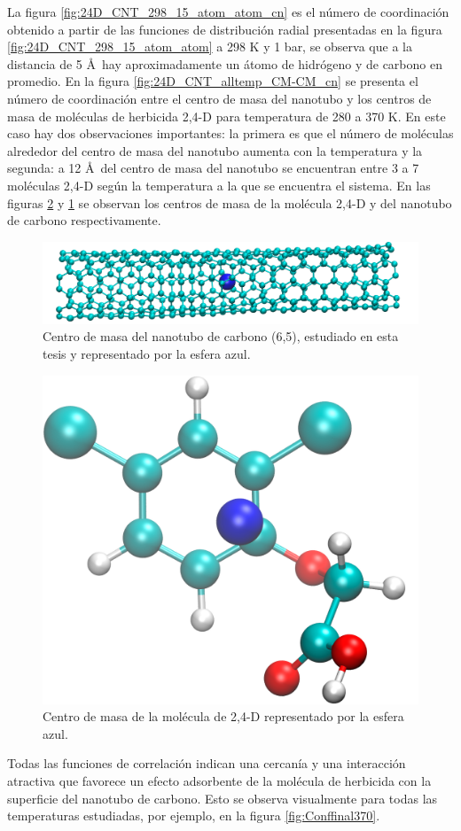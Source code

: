 La figura \ref{fig:24D_CNT_298_15_atom_atom_cn} es el número de coordinación obtenido a partir de las funciones de distribución radial presentadas en la figura \ref{fig:24D_CNT_298_15_atom_atom} a 298 K  y 1 bar, se observa que a la distancia de 5 \AA\ hay aproximadamente un átomo de hidrógeno y de carbono en promedio. En la figura \ref{fig:24D_CNT_alltemp_CM-CM_cn} se presenta el número de coordinación entre el centro de masa del nanotubo y los centros de masa de moléculas de herbicida 2,4-D para temperatura de 280 a 370 K. En este caso hay dos observaciones importantes: la primera es que el número de moléculas alrededor del centro de masa del nanotubo aumenta con la temperatura y la segunda: a 12 \AA\  del centro de masa del nanotubo se encuentran entre 3 a 7 moléculas 2,4-D según la temperatura a la que se encuentra el sistema. En las figuras \ref{fig:24DCOM} y \ref{fig:CNTCOM} se observan los centros de masa de la molécula 2,4-D y del nanotubo de carbono respectivamente.\\

\begin{figure}[!h]
    \centering
    \includegraphics[width=.9\textwidth,keepaspectratio=true]{resultados/CNTCOM.png}
    \caption{Centro de masa del nanotubo de carbono (6,5), estudiado en esta tesis y representado por la esfera azul.}
    \label{fig:CNTCOM}
\end{figure}

\begin{figure}[!h]
    \centering
    \includegraphics[width=.3\textwidth,keepaspectratio=true]{resultados/24DCOM.png}
    \caption{Centro de masa de la molécula de 2,4-D representado por la esfera azul.}
    \label{fig:24DCOM}
\end{figure}

\newpage

Todas las funciones de correlación indican una cercanía y una interacción atractiva que favorece un efecto adsorbente de la molécula de herbicida con la superficie del nanotubo de carbono. Esto se observa visualmente para todas las temperaturas estudiadas, por ejemplo, en la figura \ref{fig:Conffinal370}. 

